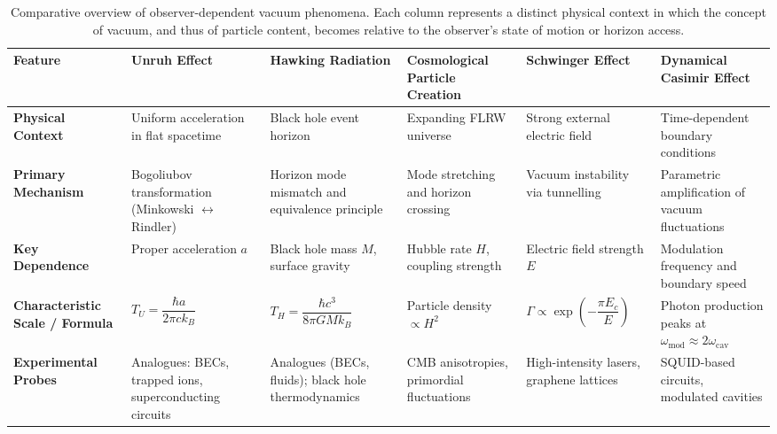 \vspace*{\fill}
\begin{table}[ht]
\centering
\footnotesize
\renewcommand{\arraystretch}{1.3}
\setlength{\tabcolsep}{3pt}
\begin{tabular}{|>{\centering\arraybackslash}m{2.0cm}|
                >{\centering\arraybackslash}m{2.2cm}|
                >{\centering\arraybackslash}m{2.2cm}|
                >{\centering\arraybackslash}m{2.2cm}|
                >{\centering\arraybackslash}m{2.2cm}|
                >{\centering\arraybackslash}m{2.2cm}|}
\hline
\textbf{Feature} & \textbf{Unruh Effect} & \textbf{Hawking Radiation} & \textbf{Cosmological Particle Creation} & \textbf{Schwinger Effect} & \textbf{Dynamical Casimir Effect} \\
\hline
\textbf{Physical Context} & Uniform acceleration in flat spacetime & Black hole event horizon & Expanding FLRW universe & Strong external electric field & Time-dependent boundary conditions \\
\hline
\textbf{Primary Mechanism} & Bogoliubov transformation (Minkowski $\leftrightarrow$ Rindler) & Horizon mode mismatch and equivalence principle & Mode stretching and horizon crossing & Vacuum instability via tunnelling & Parametric amplification of vacuum fluctuations \\
\hline
\textbf{Key Dependence} & Proper acceleration $a$ & Black hole mass $M$, surface gravity & Hubble rate $H$, coupling strength & Electric field strength $E$ & Modulation frequency and boundary speed \\
\hline
\textbf{Characteristic Scale / Formula} & $T_U = \dfrac{\hbar a}{2\pi c k_B}$ & $T_H = \dfrac{\hbar c^3}{8\pi G M k_B}$ & Particle density $\propto H^2$ & $\Gamma \propto \exp\left(-\dfrac{\pi E_c}{E}\right)$ & Photon production peaks at $\omega_{\text{mod}} \approx 2\omega_{\text{cav}}$ \\
\hline
\textbf{Experimental Probes} & Analogues: BECs, trapped ions, superconducting circuits & Analogues (BECs, fluids); black hole thermodynamics & CMB anisotropies, primordial fluctuations & High-intensity lasers, graphene lattices & SQUID-based circuits, modulated cavities \\
\hline
\end{tabular}
\caption*{
\centering
Comparative overview of observer-dependent vacuum phenomena. Each column represents a distinct physical context in which the concept of vacuum, and thus of particle content, becomes relative to the observer's state of motion or horizon access.
}
\end{table}
\vspace*{\fill}



